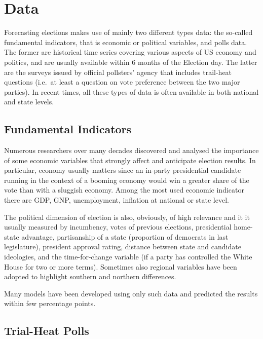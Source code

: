 \documentclass[
  12pt]{article}
\begin{document}
\hypertarget{data}{%
\section{Data}\label{data}}

Forecasting elections makes use of mainly two different types data: the
so-called fundamental indicators, that is economic or political
variables, and polls data. The former are historical time series
covering various aspects of US economy and politics, and are usually
available within 6 months of the Election day. The latter are the
surveys issued by official pollsters' agency that includes trail-heat
questions (i.e.~at least a question on vote preference between the two
major parties). In recent times, all these types of data is often
available in both national and state levels.

\hypertarget{fundamental-indicators}{%
\subsection{Fundamental Indicators}\label{fundamental-indicators}}

Numerous researchers over many decades discovered and analysed the
importance of some economic variables that strongly affect and
anticipate election results. In particular, economy usually matters
since an in-party presidential candidate running in the context of a
booming economy would win a greater share of the vote than with a
sluggish economy. Among the most used economic indicator there are GDP,
GNP, unemployment, inflation at national or state level.

The political dimension of election is also, obviously, of high
relevance and it it usually measured by incumbency, votes of previous
elections, presidential home-state advantage, partisanship of a state
(proportion of democrats in last legislature), president approval
rating, distance between state and candidate ideologies, and the
time-for-change variable (if a party has controlled the White House for
two or more terms). Sometimes also regional variables have been adopted
to highlight southern and northern differences.

Many models have been developed using only such data and predicted the
results within few percentage points.

\hypertarget{trial-heat-polls}{%
\subsection{Trial-Heat Polls}\label{trial-heat-polls}}
\end{document}

